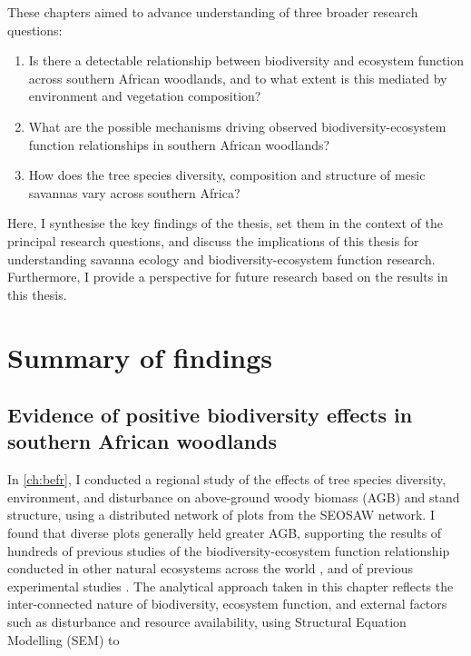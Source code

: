 \begin{refsection}
These chapters aimed to advance understanding of three broader research questions:

\begin{enumerate}
\item{Is there a detectable relationship between biodiversity and ecosystem function across southern African woodlands, and to what extent is this mediated by environment and vegetation composition?}
\item{What are the possible mechanisms driving observed biodiversity-ecosystem function relationships in southern African woodlands?}
\item{How does the tree species diversity, composition and structure of mesic savannas vary across southern Africa?}
\end{enumerate}

Here, I synthesise the key findings of the thesis, set them in the context of the principal research questions, and discuss the implications of this thesis for understanding savanna ecology and biodiversity-ecosystem function research. Furthermore, I provide a perspective for future research based on the results in this thesis.

\section{Summary of findings}

\subsection{Evidence of positive biodiversity effects in southern African woodlands}

In \autoref{ch:befr}, I conducted a regional study of the effects of tree species diversity, environment, and disturbance on above-ground woody biomass (AGB) and stand structure, using a distributed network of plots from the SEOSAW network. I found that diverse plots generally held greater AGB, supporting the results of hundreds of previous studies of the biodiversity-ecosystem function relationship conducted in other natural ecosystems across the world \citep{Plas2019}, and of previous experimental studies \citep{Tilman2014}. The analytical approach taken in this chapter reflects the inter-connected nature of biodiversity, ecosystem function, and external factors such as disturbance and resource availability, using Structural Equation Modelling (SEM) to 


\end{refsection}
